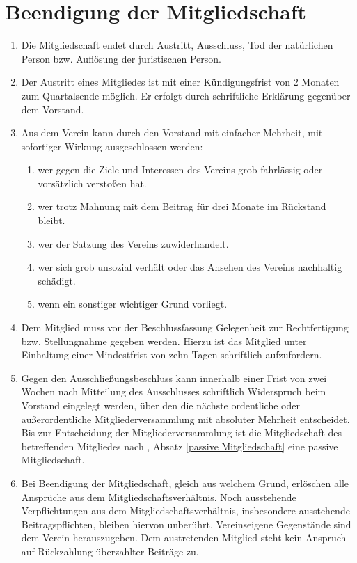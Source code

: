 \documentclass[a4paper,ngerman]{scrartcl}
\newcommand{\customref}[1]{\sectionref{#1}, Absatz \ref{#1}}
\begin{document}
\section{Beendigung der Mitgliedschaft}
\begin{enumerate}
\item Die Mitgliedschaft endet durch Austritt, Ausschluss, Tod der natürlichen Person bzw. Auflösung der juristischen Person.
\item Der Austritt eines Mitgliedes ist mit einer Kündigungsfrist von 2 Monaten zum Quartalsende möglich. Er erfolgt durch schriftliche Erklärung gegenüber dem Vorstand.
\item Aus dem Verein kann durch den Vorstand mit einfacher Mehrheit, mit sofortiger Wirkung ausgeschlossen werden:
\begin{enumerate}
\item wer gegen die Ziele und Interessen des Vereins grob fahrlässig oder vorsätzlich verstoßen hat.
\item wer trotz Mahnung mit dem Beitrag für drei Monate im Rückstand bleibt.
\item wer der Satzung des Vereins zuwiderhandelt.
\item wer sich grob unsozial verhält oder das Ansehen des Vereins nachhaltig schädigt.
\item wenn ein sonstiger wichtiger Grund vorliegt.
\end{enumerate}
\item Dem Mitglied muss vor der Beschlussfassung Gelegenheit zur Rechtfertigung bzw. Stellungnahme gegeben werden. Hierzu ist das Mitglied unter Einhaltung einer Mindestfrist von zehn Tagen schriftlich aufzufordern.
\item Gegen den Ausschließungsbeschluss kann innerhalb einer Frist von zwei Wochen nach Mitteilung des Ausschlusses schriftlich Widerspruch beim Vorstand eingelegt werden, über den die nächste ordentliche oder außerordentliche Mitgliederversammlung mit absoluter Mehrheit entscheidet. Bis zur Entscheidung der Mitgliederversammlung ist die Mitgliedschaft des betreffenden Mitgliedes nach \customref{passive Mitgliedschaft} eine passive Mitgliedschaft.
\item Bei Beendigung der Mitgliedschaft, gleich aus welchem Grund, erlöschen alle Ansprüche aus dem Mitgliedschaftsverhältnis. Noch ausstehende Verpflichtungen aus dem Mitgliedschaftsverhältnis, insbesondere ausstehende Beitragspflichten, bleiben hiervon unberührt. Vereinseigene Gegenstände sind dem Verein herauszugeben.
Dem austretenden Mitglied steht kein Anspruch auf Rückzahlung überzahlter Beiträge zu.
\end{enumerate}
\end{document}
